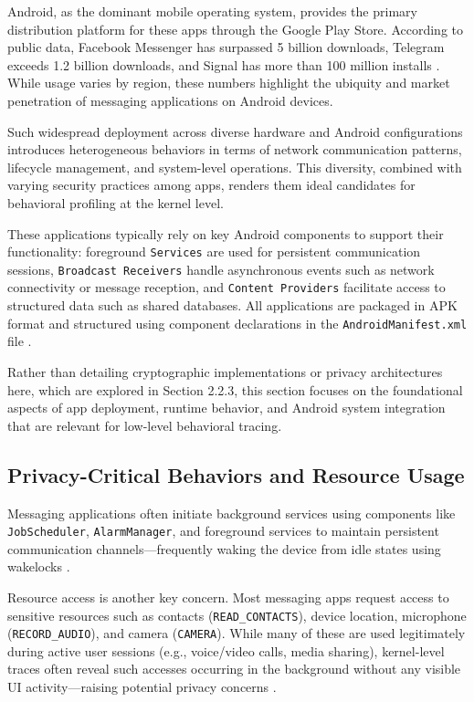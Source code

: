 \documentclass[a4paper,12pt]{report}
\begin{document}
Android, as the dominant mobile operating system, provides the primary distribution platform for these apps through the Google Play Store. According to public data, Facebook Messenger has surpassed 5 billion downloads, Telegram exceeds 1.2 billion downloads, and Signal has more than 100 million installs \cite{StatistaMessenger, StatistaTelegram, StatistaSignal}. While usage varies by region, these numbers highlight the ubiquity and market penetration of messaging applications on Android devices.

Such widespread deployment across diverse hardware and Android configurations introduces heterogeneous behaviors in terms of network communication patterns, lifecycle management, and system-level operations. This diversity, combined with varying security practices among apps, renders them ideal candidates for behavioral profiling at the kernel level.

These applications typically rely on key Android components to support their functionality: foreground \texttt{Services} are used for persistent communication sessions, \texttt{Broadcast Receivers} handle asynchronous events such as network connectivity or message reception, and \texttt{Content Providers} facilitate access to structured data such as shared databases. All applications are packaged in APK format and structured using component declarations in the \texttt{AndroidManifest.xml} file \cite{AOSPArchOverview}.

Rather than detailing cryptographic implementations or privacy architectures here, which are explored in Section 2.2.3, this section focuses on the foundational aspects of app deployment, runtime behavior, and Android system integration that are relevant for low-level behavioral tracing.

\subsection{Privacy-Critical Behaviors and Resource Usage}
Messaging applications often initiate background services using components like \\
\texttt{JobScheduler}, \texttt{AlarmManager}, and foreground services to maintain persistent communication channels—frequently waking the device from idle states using wakelocks \cite{AOSPWakelocks}.

Resource access is another key concern. Most messaging apps request access to sensitive resources such as contacts (\texttt{READ\_CONTACTS}), device location, microphone (\texttt{RECORD\_AUDIO}), and camera (\texttt{CAMERA}). While many of these are used legitimately during active user sessions (e.g., voice/video calls, media sharing), kernel-level traces often reveal such accesses occurring in the background without any visible UI activity—raising potential privacy concerns \cite{enck2014taintdroid}.
\end{document}
